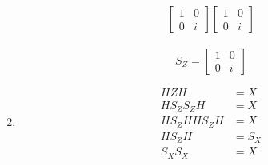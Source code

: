 \documentclass{assignment}
\begin{document}
\begin{problemlist}
\begin{answer}
\begin{enumerate}
\[\begin{bmatrix}
          1 & 0\\
          0 & i
        \end{bmatrix}
        \begin{bmatrix}
          1 & 0\\
          0 & i
        \end{bmatrix}
        \]\\
        \[
        S_Z = 
        \begin{bmatrix}
          1 & 0\\
          0 & i
        \end{bmatrix}
        \]
      \item
        \begin{align*}
        HZH &= X\\
        HS_ZS_ZH &= X\\
        HS_ZHHS_ZH &= X\\
        HS_ZH &= S_X\\
        S_XS_X &= X
        \end{align*}
    \end{enumerate}
  \end{answer}


\end{problemlist}
\end{document}
